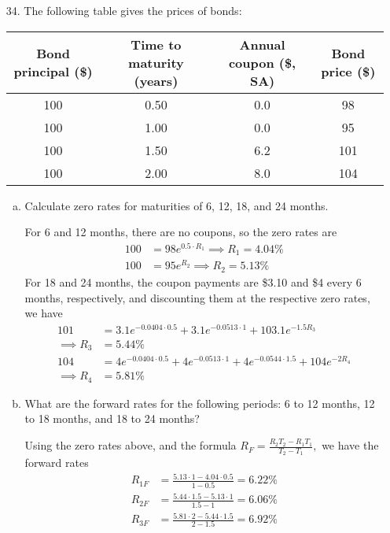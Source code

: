 \documentclass{article}
\begin{document}
\begin{itemize}
	\item[34.] The following table gives the prices of bonds:
		\begin{center}
			\begin{tabular}{cccc}
				Bond principal (\$) & Time to maturity (years) & Annual coupon (\$, SA) & Bond price (\$) \\
				\hline
				100 & 0.50 & 0.0 & 98 \\
				100 & 1.00 & 0.0 & 95 \\
				100 & 1.50 & 6.2 & 101 \\
				100 & 2.00 & 8.0 & 104
			\end{tabular}
		\end{center}
		\begin{enumerate}[(a)]
			\item Calculate zero rates for maturities of 6, 12, 18, and 24 months.
				\begin{soln}
					For 6 and 12 months, there are no coupons, so the zero rates are
					\begin{align*}
						100 &= 98e^{0.5\cdot R_1} \implies R_1 = 4.04\% \\
						100 &= 95e^{R_2} \implies R_2 = 5.13\%
					\end{align*}
					For 18 and 24 months, the coupon payments are \$3.10 and \$4 every 6 months, respectively, and discounting them at the respective zero rates, we have
					\begin{align*}
						101 &= 3.1e^{-0.0404\cdot 0.5} + 3.1e^{-0.0513\cdot 1} + 103.1e^{-1.5R_3} \\
						\implies R_3 &= 5.44\% \\
						104 &= 4e^{-0.0404\cdot 0.5}+4e^{-0.0513\cdot 1} + 4e^{-0.0544\cdot 1.5} + 104e^{-2R_4} \\
						\implies R_4 &= 5.81\%
					\end{align*}
				\end{soln}
			
			\item What are the forward rates for the following periods: 6 to 12 months, 12 to 18 months, and 18 to 24 months?
				\begin{soln}
					Using the zero rates above, and the formula $R_F = \frac{R_2T_2-R_1T_1}{T_2-T_1},$ we have the forward rates
					\begin{align*}
						R_{1F} &= \frac{5.13\cdot 1-4.04\cdot 0.5}{1-0.5} = 6.22\% \\
						R_{2F} &= \frac{5.44\cdot 1.5-5.13\cdot 1}{1.5-1} = 6.06\% \\
						R_{3F} &= \frac{5.81\cdot 2-5.44\cdot 1.5}{2-1.5} = 6.92\%
					\end{align*}
				\end{soln}


\end{enumerate}
\end{itemize}
\end{document}
